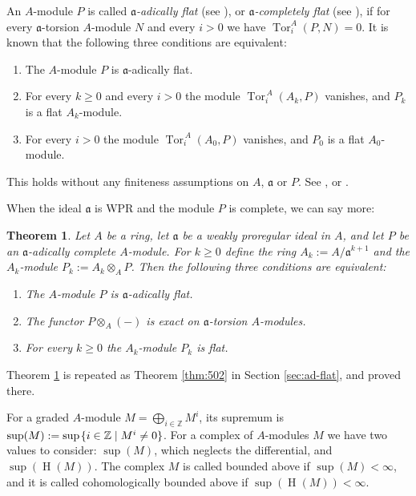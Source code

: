 \documentclass[10pt]{amsart}
\newtheorem{thm}[equation]{Theorem}
\theoremstyle{definition}
\numberwithin{equation}{section}
\newcommand{\opn}{\operatorname}
\newcommand{\rmitem}[1]{\item[\textrm{(#1)}]}
\newcommand{\mfrak}[1]{\mathfrak{#1}}
\renewcommand{\a}{\mfrak{a}}
\newcommand{\Z}{\mathbb{Z}}
\newcommand{\ot}{\otimes}
\newcommand{\msp}[1]{\mspace{#1 mu}}
\begin{document}
An $A$-module $P$ is called {\em $\a$-adically flat} (see
\cite[Definition 4.2]{Ye2}), or
{\em $\a$-completely flat} (see \cite[Section 1.2]{BS}), if for every
$\a$-torsion $A$-module $N$ and every $i > 0$ we have $\opn{Tor}^A_i(P, N) = 0$.
It is known that the following three conditions are equivalent:
\begin{enumerate}
\item[$\rhd$] The $A$-module $P$ is $\a$-adically flat.

\item[$\rhd$]  For every $k \geq 0$ and every $i > 0$ the module
$\opn{Tor}^{\, A}_i(A_k, P)$ vanishes, and $P_k$ is a flat $A_k$-module.

\item[$\rhd$]  For every $i > 0$ the module
$\opn{Tor}^{\, A}_i(A_0, P)$ vanishes, and $P_0$ is a flat $A_0$-module.
\end{enumerate}
This holds without any finiteness assumptions on $A$, $\a$ or $P$.
See \cite[Theorem 4.3]{Ye4}, \cite[Section 4.1]{BMS} or
\cite[Section 1.2]{BS}.

When the ideal $\a$ is WPR and the module $P$ is complete, we can say more:

\begin{thm} \label{thm:501}
Let $A$ be a ring, let $\a$ be a weakly proregular ideal in $A$,
and let $P$ be an $\a$-adically complete $A$-module. For $k \geq 0$ define the
ring $A_k := A / \a^{k + 1}$ and the $A_k$-module $P_k := A_k \ot_A P$.
Then the following three conditions are equivalent:
\begin{enumerate}
\rmitem{i} The $A$-module $P$ is $\a$-adically flat.

\rmitem{ii} The functor $P \ot_{A} (-)$ is exact on $\a$-torsion $A$-modules.

\rmitem{iii} For every $k \geq 0$ the $A_k$-module $P_k$ is flat.
\end{enumerate}
\end{thm}

Theorem \ref{thm:501} is repeated as Theorem \ref{thm:502} in Section
\ref{sec:ad-flat}, and proved there.

For a graded $A$-module $M = \bigoplus_{i \in \Z} M^i$, its supremum is
$\opn{sup}(M) := \opn{sup} \msp{2} \{ i \in \Z \mid M^i \neq 0 \}$.
For a complex of $A$-modules $M$ we have two values to consider:
$\opn{sup}(M)$, which neglects the differential, and
$\opn{sup}(\opn{H}(M))$.
The complex $M$ is called bounded above if $\opn{sup}(M) < \infty$,
and it is called cohomologically bounded above
if $\opn{sup}(\opn{H}(M)) < \infty$.
\end{document}
